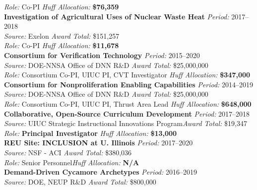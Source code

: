 \documentclass[margin,line]{resume}
\begin{document}
\begin{resume}
    \textsl{Role:} Co-PI \hfill \textsl{Huff Allocation:} \textbf{\$76,359}\vspace{2mm}\\%
    \textbf{Investigation of Agricultural Uses of Nuclear Waste Heat} \hfill \textsl{Period:} 2017--2018\\
    \textsl{Source:} Exelon \hfill \textsl{Award Total:} \$151,257\\
    \textsl{Role:} Co-PI \hfill \textsl{Huff Allocation:} \textbf{\$11,678}\vspace{2mm}\\%
    \textbf{Consortium for Verification Technology} \hfill \textsl{Period:} 2015--2020\\
    \textsl{Source:} DOE-NNSA Office of DNN R\&D \hfill \textsl{Award Total:} \$25,000,000\\
    \textsl{Role:} Consortium Co-PI, UIUC PI, CVT Investigator  \hfill \textsl{Huff Allocation:} \textbf{\$347,000}\vspace{2mm}\\%
    \textbf{Consortium for Nonproliferation Enabling Capabilities} \hfill \textsl{Period:} 2014--2019\\
    \textsl{Source:} DOE-NNSA Office of DNN R\&D \hfill \textsl{Award Total:} \$25,000,000\\
    \textsl{Role:} Consortium Co-PI, UIUC PI, Thrust Area Lead  \hfill \textsl{Huff Allocation:} \textbf{\$648,000}\vspace{2mm}\\%
    \textbf{Collaborative, Open-Source Curriculum Development} \hfill \textsl{Period:} 2017--2018\\
    \textsl{Source:} UIUC Strategic Instructional Innovations Program\hfill \textsl{Award Total:} \$19,347\\
    \textsl{Role:} \textbf{Principal Investigator}  \hfill \textsl{Huff Allocation:} \textbf{\$13,000}\vspace{2mm}\\%
    \textbf{REU Site: INCLUSION at U. Illinois} \hfill \textsl{Period:}
    2017--2020\\
    \textsl{Source:} NSF - ACI \hfill \textsl{Award Total:} \$380,036\\
    \textsl{Role:} Senior Personnel\hfill \textsl{Huff Allocation:} \textbf{N/A}\vspace{2mm}\\%
    \textbf{Demand-Driven Cycamore Archetypes} \hfill \textsl{Period:} 2016--2019\\
    \textsl{Source:} DOE, NEUP R\&D \hfill \textsl{Award Total:} \$800,000\\

\end{resume}
\end{document}
